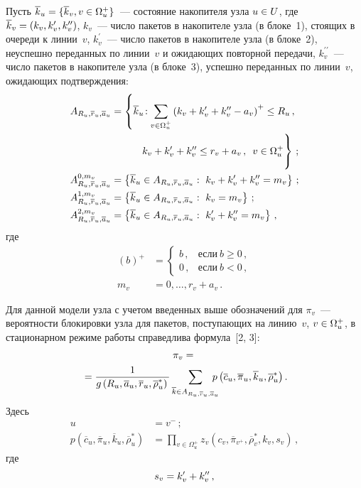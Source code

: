 \begin{multicols}{2}
   Пусть $\overline{k}_u=\{\overline{k}_v, v\hm\in\Omega_u^+\}$~--- 
состояние накопителя узла $u\hm\in U$, 
где $\overline{k}_v\hm=\left(k_v,k_v^\prime,k_v^{\prime\prime}\right)$, $k_v$~--- чис\-ло 
пакетов в накопителе узла (в блоке~1), стоящих в очереди к линии~$v$, 
$k_v^\prime$~--- число пакетов в накопителе узла (в блоке~2), неуспешно 
переданных по линии~$v$ и ожидающих повторной передачи, 
$k_v^{\prime\prime}$~--- число пакетов в накопителе узла (в блоке~3), 
успешно переданных по линии~$v$, ожидающих подтверждения:
   \begin{align*}
   A_{R_u,\overline{r}_u, \overline{a}_u} &=\left \{ 
   \overline{k}_u\!: \sum\limits_{v\in\Omega_u^+}\left( 
k_v+k_v^\prime+k_v^{\prime\prime}-a_v\right)^+\leq
   R_u\,,
   \right.\\ 
&\left.    \vphantom{\sum\limits_{v\in\Omega_u^+}}
  \hspace*{10mm}k_v+k_v^\prime+k_v^{\prime\prime}\leq r_v+a_v\,,\enskip v\in 
\Omega_u^+\right\}\,;\\
A^{0,m_v}_{R_u, \overline{r}_u, \overline{a}_u} &= \left\{ \overline{k}_u\in 
A_{ R_u, \overline{r}_u, \overline{a}_u }:\ 
k_v+k_v^\prime+k_v^{\prime\prime}=m_v\right\}\,;\\
A^{1,m_v}_{ R_u, \overline{r}_u, \overline{a}_u }&= \left\{ \overline{k}_u\in 
A_{ R_u, \overline{r}_u, \overline{a}_u}:\ k_v=m_v\right\}\,;\\
A^{2,m_v}_{ R_u, \overline{r}_u, \overline{a}_u} &= \left\{ \overline{k}_u\in 
A_{ R_u, \overline{r}_u, \overline{a}_u}:\ 
k_v^\prime+k_v^{\prime\prime}=m_v\right\}\,,
\end{align*}
где 
\begin{align*}
(b)^+ & =\begin{cases}
b\,, & \mbox{если}\ b\geq 0\,,\\
0\,, & \mbox{если}\ b<0\,,
\end{cases}\\
m_v &= 0, \ldots , r_v+a_v\,.
\end{align*}

   Для данной модели узла с учетом введенных выше обозначений для 
$\pi_v$~--- вероятности блокировки узла для пакетов, поступающих на 
линию~$v$, $v\hm\in\Omega_u^+$, в стационарном режиме работы 
справедлива формула~[2, 3]:
   \begin{multline} 
   \pi_v = {}\\
   {}=\fr{1}{g\left(R_u, \overline{a}_u, \overline{r}_u, 
\overline{\rho}_u^*\right)}\sum\limits_{\overline{k}\in A_{R_u, \overline{r}_u, 
\overline{a}_u}} \hspace*{-3mm}p\left( \overline{c}_u, \overline{\pi}_u, 
\overline{k}_u,\overline{\rho}_u^*\right).
   \label{e1aga}
   \end{multline}
Здесь 
\begin{align*}
u&=v^-\,;\\[3pt]
p\left( \overline{c}_u, \overline{\pi}_u, 
\overline{k}_u,\overline{\rho}_u^*\right)&= \prod\limits_{v\in\Omega_u^+} 
z_v\left(c_v, \overline{\pi}_{v^+}, \overline{\rho}^*_v, k_v, s_v\right)\,,
\end{align*}
где  
$$
s_v\hm=k_v^\prime\hm+k_v^{\prime\prime}\,,
$$


\end{multicols}
